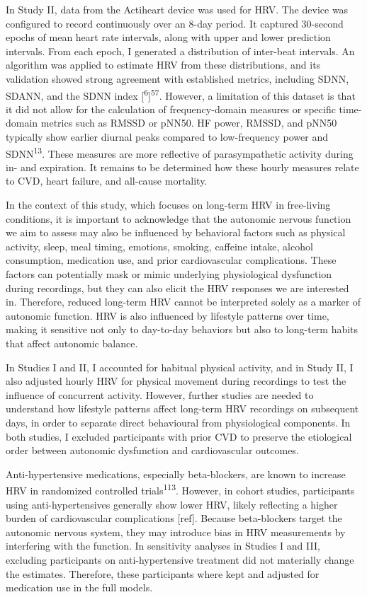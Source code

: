 \documentclass[
  a4paper,
  headsepline=true,
  open=any]{scrbook}
\begin{document}
In Study II, data from the Actiheart device was used for HRV. The device
was configured to record continuously over an 8-day period. It captured
30-second epochs of mean heart rate intervals, along with upper and
lower prediction intervals. From each epoch, I generated a distribution
of inter-beat intervals. An algorithm was applied to estimate HRV from
these distributions, and its validation showed strong agreement with
established metrics, including SDNN, SDANN, and the SDNN index
{[}\textsuperscript{6}{]}\textsuperscript{57}. However, a limitation of
this dataset is that it did not allow for the calculation of
frequency-domain measures or specific time-domain metrics such as RMSSD
or pNN50. HF power, RMSSD, and pNN50 typically show earlier diurnal
peaks compared to low-frequency power and SDNN\textsuperscript{13}.
These measures are more reflective of parasympathetic activity during
in- and expiration. It remains to be determined how these hourly
measures relate to CVD, heart failure, and all-cause mortality.

In the context of this study, which focuses on long-term HRV in
free-living conditions, it is important to acknowledge that the
autonomic nervous function we aim to assess may also be influenced by
behavioral factors such as physical activity, sleep, meal timing,
emotions, smoking, caffeine intake, alcohol consumption, medication use,
and prior cardiovascular complications. These factors can potentially
mask or mimic underlying physiological dysfunction during recordings,
but they can also elicit the HRV responses we are interested in.
Therefore, reduced long-term HRV cannot be interpreted solely as a
marker of autonomic function. HRV is also influenced by lifestyle
patterns over time, making it sensitive not only to day-to-day behaviors
but also to long-term habits that affect autonomic balance.

In Studies I and II, I accounted for habitual physical activity, and in
Study II, I also adjusted hourly HRV for physical movement during
recordings to test the influence of concurrent activity. However,
further studies are needed to understand how lifestyle patterns affect
long-term HRV recordings on subsequent days, in order to separate direct
behavioural from physiological components. In both studies, I excluded
participants with prior CVD to preserve the etiological order between
autonomic dysfunction and cardiovascular outcomes.

Anti-hypertensive medications, especially beta-blockers, are known to
increase HRV in randomized controlled trials\textsuperscript{113}.
However, in cohort studies, participants using anti-hypertensives
generally show lower HRV, likely reflecting a higher burden of
cardiovascular complications {[}ref{]}. Because beta-blockers target the
autonomic nervous system, they may introduce bias in HRV measurements by
interfering with the function. In sensitivity analyses in Studies I and
III, excluding participants on anti-hypertensive treatment did not
materially change the estimates. Therefore, these participants where
kept and adjusted for medication use in the full models.
\end{document}
